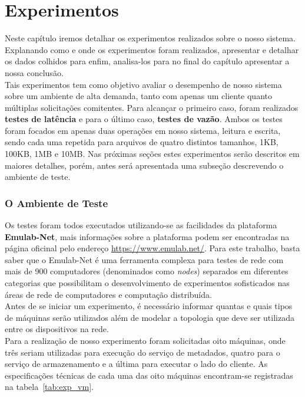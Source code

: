	\section{Experimentos}
	Neste capítulo iremos detalhar os experimentos realizados sobre o nosso sistema. Explanando como e onde os experimentos foram realizados, apresentar e detalhar os dados colhidos para enfim, analisa-los para no final do capítulo apresentar a nossa conclusão.
	\\
	
	Tais experimentos tem como objetivo avaliar o desempenho de nosso sistema sobre um ambiente de alta demanda, tanto com apenas um cliente quanto múltiplas solicitações  comitentes. Para alcançar o primeiro caso, foram realizados \textbf{testes de latência} e para o último caso, \textbf{testes de vazão}. Ambos os testes foram focados em apenas duas operações em nosso sistema, leitura e escrita, sendo cada uma repetida para arquivos de quatro distintos tamanhos, 1KB, 100KB, 1MB e 10MB. Nas próximas seções estes experimentos serão descritos em maiores detalhes, porém, antes será apresentada uma subseção descrevendo o ambiente de teste.
	\\
	
	\subsubsection{O Ambiente de Teste}
	Os testes foram todos executados utilizando-se as facilidades da plataforma \textbf{Emulab-Net}, mais informações sobre a plataforma podem ser encontradas na página oficinal pelo endereço \href{https://www.emulab.net/}{https://www.emulab.net/}. Para este trabalho, basta saber que o Emulab-Net é uma ferramenta complexa para testes de rede com mais de 900 computadores (denominados como \textit{nodes}) separados em diferentes categorias que possibilitam o desenvolvimento de experimentos sofisticados nas áreas de rede de computadores e computação distribuída.
	\\
	
	Antes de se iniciar um experimento, é necessário informar quantas e quais tipos de máquinas serão utilizados além de modelar a topologia que deve ser utilizada entre os dispositivos na rede. 
	\\
	
	Para a realização de nosso experimento foram solicitadas oito máquinas, onde três seriam utilizadas para execução do serviço de metadados, quatro para o serviço de armazenamento e a última para executar o lado do cliente. As especificações técnicas de cada uma das oito máquinas encontram-se registradas na tabela~\ref{tab:exp_vm}.
	\\
	

